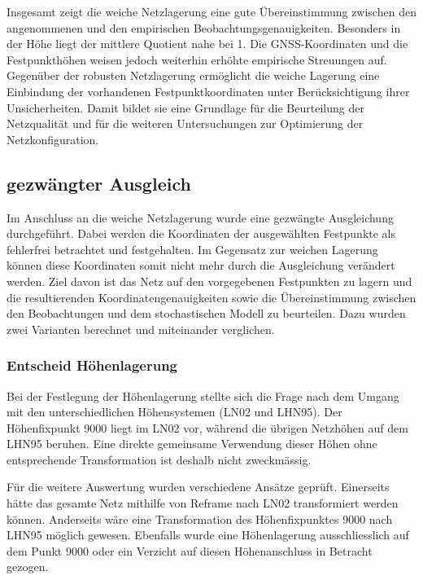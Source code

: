 Insgesamt zeigt die weiche Netzlagerung eine gute Übereinstimmung zwischen den angenommenen und
den empirischen Beobachtungsgenauigkeiten. Besonders in der Höhe liegt der mittlere Quotient nahe
bei 1. Die GNSS-Koordinaten und die Festpunkthöhen weisen jedoch weiterhin erhöhte empirische
Streuungen auf. Gegenüber der robusten Netzlagerung ermöglicht die weiche Lagerung eine Einbindung
der vorhandenen Festpunktkoordinaten unter Berücksichtigung ihrer Unsicherheiten. Damit bildet
sie eine Grundlage für die Beurteilung der Netzqualität und für die weiteren Untersuchungen
zur Optimierung der Netzkonfiguration.

\subsection{gezwängter Ausgleich}
\label{sec:gezwängter ausgleich}

Im Anschluss an die weiche Netzlagerung wurde eine gezwängte Ausgleichung durchgeführt.
Dabei werden die Koordinaten der ausgewählten Festpunkte als fehlerfrei betrachtet und festgehalten.
Im Gegensatz zur weichen Lagerung können diese Koordinaten somit nicht mehr durch die Ausgleichung verändert
werden. Ziel davon ist das Netz auf den vorgegebenen Festpunkten zu lagern und die resultierenden
Koordinatengenauigkeiten sowie die Übereinstimmung zwischen den Beobachtungen und dem stochastischen
Modell zu beurteilen. Dazu wurden zwei Varianten berechnet und miteinander verglichen. \bigskip

\subsubsection{Entscheid Höhenlagerung}
\label{sec:entscheid hoehenlagerung}
Bei der Festlegung der Höhenlagerung stellte sich die Frage nach dem Umgang mit den unterschiedlichen
Höhensystemen (LN02 und LHN95). Der Höhenfixpunkt 9000 liegt im LN02 vor, während die übrigen Netzhöhen
auf dem LHN95 beruhen. Eine direkte gemeinsame Verwendung dieser Höhen ohne entsprechende Transformation
ist deshalb nicht zweckmässig. \bigskip

Für die weitere Auswertung wurden verschiedene Ansätze geprüft. Einerseits hätte das gesamte Netz 
mithilfe von Reframe nach LN02 transformiert werden können. Anderseits wäre eine Transformation des
Höhenfixpunktes 9000 nach LHN95 möglich gewesen. Ebenfalls wurde eine Höhenlagerung ausschliesslich auf
dem Punkt 9000 oder ein Verzicht auf diesen Höhenanschluss in Betracht gezogen. \bigskip


